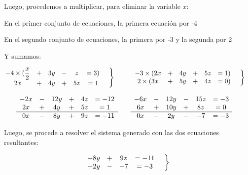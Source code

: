 \documentclass[12pt]{article}
\begin{document}
    Luego, procedemos a multiplicar, para eliminar la variable $x$:

    En el primer conjunto de ecuaciones, la primera ecuación por -4

    En el segundo conjunto de ecuaciones, la primera por -3 y la segunda por 2

    Y sumamos:

   \begin{align*}
        \left.
        \begin{matrix}
           -4\times(\displaystyle\frac{x}{2} &+& 3y &-& z &= 3) \\
            2x &+& 4y &+&5z &= 1\\
        \end{matrix}
        \hspace*{0.5cm}\right\rbrace\hspace*{1cm}&
        \left.
        \begin{matrix}
            -3\times(2x &+& 4y &+&5z &= 1)\\
            2\times(3x &+& 5y &+& 4z &=0)
        \end{matrix}
        \hspace*{0.5cm}\right\rbrace
    \end{align*}




   \begin{align*}
        \begin{matrix}
           -2x &-& 12y &+& 4z &= -12 \\
            2x &+& 4y &+&5z &= 1\\
            \hline
            0x &-& 8y &+&9z &= -11
        \end{matrix}
        \hspace*{1cm}&
        \begin{matrix}
            -6x &-& 12y &-&15z &= -3\\
            6x &+& 10y &+& 8z &=0\\
            \hline
            0x &-&2y &-&-7 &= -3
        \end{matrix}
   \end{align*}

   Luego, se procede a resolver el sistema generado con las dos ecuaciones resultantes:


    \begin{equation*}
        \left.
        \begin{matrix}
           -8y &+&9z &= -11\\
            -2y &-&-7 &= -3
        \end{matrix}
        \hspace*{0.5cm}\right\rbrace
    \end{equation*}
\end{document}
